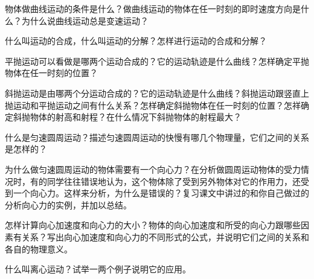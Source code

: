 \begin{Review}
\begin{question}
	\item 物体做曲线运动的条件是什么？做曲线运动的物体在任一时刻的即时速度方向是什么？为什么说曲线运动总是变速运动？
  \item 什么叫运动的合成，什么叫运动的分解？怎样进行运动的合成和分解？
  \item 平抛运动可以看做是哪两个运动合成的？它的运动轨迹是什么曲线？怎样确定平抛物体在任一时刻的位置？
  \item 斜抛运动是由哪两个分运动合成的？它的运动轨迹是什么曲线？斜抛运动跟竖直上抛运动和平抛运动之间有什么关系？怎样确定斜抛物体在任一时刻的位置？怎祥确定斜抛物体的射高和射程？在什么情况下斜抛物体的射程最大？
  \item 什么是匀速圆周运动？描述匀速圆周运动的快慢有哪几个物理量，它们之间的关系是怎样的？
  \item 为什么做匀速圆周运动的物体需要有一个向心力？在分析做圆周运动物体的受力情况时，有的同学往往错误地认为，这个物体除了受到另外物体对它的作用力，还受到一个向心力。这样来分析，为什么是错误的？复习课文中讲过的和你自己做过的分析向心力的实例，并加以总结。
  \item 怎样计算向心加速度和向心力的大小？物体的向心加速度和所受的向心力跟哪些因素有关系？写出向心加速度和向心力的不同形式的公式，并说明它们之间的关系和各自的物理意义。
  \item 什么叫离心运动？试举一两个例子说明它的应用。
\end{question}
\end{Review}


